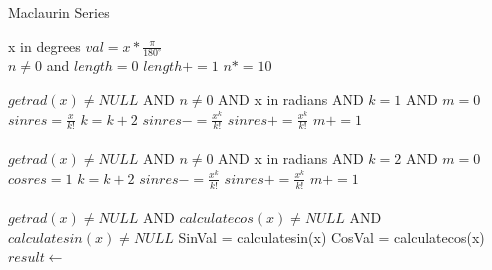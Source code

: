 \documentclass[letterpaper, 11pt]{report}
\begin{document}
\begin{algorithm}
\caption{Maclaurin Series} \label{alg:cap}
\begin{algorithmic}
\Require x in degrees
\State $val = x * \frac{\pi}{180^\circ}$\\
\EndFunction
\newline
\Require $n\neq 0$ and $length = 0$ 
\State $length += 1$
\State $n *= 10$
\EndWhile\\
\EndFunction
\end{algorithmic}
\end{algorithm}

\begin{algorithm}
\begin{algorithmic}
\Require $getrad(x)\neq NULL$ AND $n \neq 0$ AND x in radians AND $k = 1$ AND $m = 0$
\State $sinres = \frac{x}{k!}$
\State $k = k+2$
\State $sinres -= \frac{x^k}{k!}$ 
\Else
\State $sinres += \frac{x^k}{k!}$ 
\EndIf
\State $m+=1$
\EndWhile\\
\EndFunction\\
\newline
\Require $getrad(x)\neq NULL$ AND $n \neq 0$ AND x in radians AND $k = 2$ AND $m = 0$
\State $cosres = 1$
\State $k = k+2$
\State $sinres -= \frac{x^k}{k!}$ 
\Else
\State $sinres += \frac{x^k}{k!}$ 
\EndIf
\State $m+=1$
\EndWhile\\
\EndFunction\\

\Require $getrad(x)\neq NULL$ AND $ calculatecos(x)\neq NULL$ AND $calculatesin(x)\neq NULL$
\State SinVal = calculatesin(x)
\State CosVal = calculatecos(x)\\
\EndFunction
\State $result \gets $
\end{algorithmic}
\end{algorithm}
\end{document}
